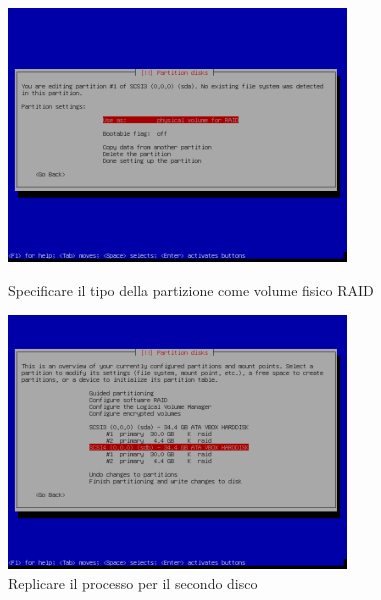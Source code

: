 \documentclass[11pt]{article}
\begin{document}
\begin{figure}[H]
    \includegraphics[width=0.8\textwidth, keepaspectratio]{../img/raid install/raid7.png}
    \centering
    \caption{Specificare il tipo della partizione come volume fisico RAID}

    \includegraphics[width=0.8\textwidth, keepaspectratio]{../img/raid install/raid8.png}
    \centering
    \caption{Replicare il processo per il secondo disco}
\end{figure}
\end{document}
